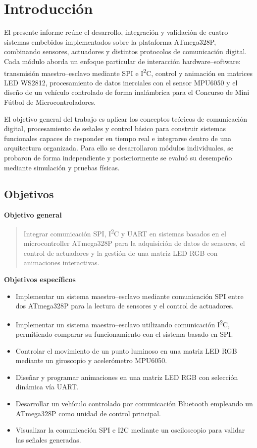 \section{Introducción}

El presente informe reúne el desarrollo, integración y validación de cuatro sistemas embebidos implementados sobre la plataforma ATmega328P, combinando sensores, actuadores y distintos protocolos de comunicación digital. Cada módulo aborda un enfoque particular de interacción hardware–software: transmisión maestro–esclavo mediante SPI e I\textsuperscript{2}C, control y animación en matrices LED WS2812, procesamiento de datos inerciales con el sensor MPU6050 y el diseño de un vehículo controlado de forma inalámbrica para el Concurso de Mini Fútbol de Microcontroladores.

El objetivo general del trabajo es aplicar los conceptos teóricos de comunicación digital, procesamiento de señales y control básico para construir sistemas funcionales capaces de responder en tiempo real e integrarse dentro de una arquitectura organizada. Para ello se desarrollaron módulos individuales, se probaron de forma independiente y posteriormente se evaluó su desempeño mediante simulación y pruebas físicas.

\vspace{1.5em}

\subsection{Objetivos}

\textbf{Objetivo general}
\begin{quote}
Integrar comunicación SPI, I\textsuperscript{2}C y UART en sistemas basados en el microcontroller ATmega328P para la adquisición de datos de sensores, el control de actuadores y la gestión de una matriz LED RGB con animaciones interactivas.
\end{quote}

\textbf{Objetivos específicos}
\begin{itemize}
    \item Implementar un sistema maestro–esclavo mediante comunicación SPI entre dos ATmega328P para la lectura de sensores y el control de actuadores.
    \item Implementar un sistema maestro–esclavo utilizando comunicación I\textsuperscript{2}C, permitiendo comparar su funcionamiento con el sistema basado en SPI.
    \item Controlar el movimiento de un punto luminoso en una matriz LED RGB mediante un giroscopio y acelerómetro MPU6050.
    \item Diseñar y programar animaciones en una matriz LED RGB con selección dinámica vía UART.
    \item Desarrollar un vehículo controlado por comunicación Bluetooth empleando un ATmega328P como unidad de control principal.
    \item Visualizar la comunicación SPI e I2C mediante un osciloscopio para validar las señales generadas.
\end{itemize}

